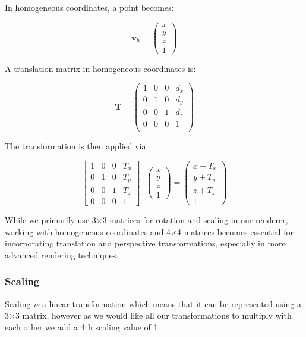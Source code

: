\documentclass[12pt]{article}
\begin{document}
In homogeneous coordinates, a point becomes:

\[
    \mathbf{v}_h = \begin{pmatrix} x \\ y \\ z \\ 1 \end{pmatrix}
\]

A translation matrix in homogeneous coordinates is:

\[
    \mathbf{T} = \begin{pmatrix}
        1 & 0 & 0 & d_x \\
        0 & 1 & 0 & d_y \\
        0 & 0 & 1 & d_z \\
        0 & 0 & 0 & 1   \\
    \end{pmatrix}
\]

The transformation is then applied via:

\[
    \begin{bmatrix}  1 & 0 & 0 & {T_x} \\ 0 & 1 & 0 & {T_y} \\ 0 & 0 & 1 & {T_z} \\ 0 & 0 & 0 & 1 \end{bmatrix} \cdot \begin{pmatrix} x \\ y \\ z \\ 1 \end{pmatrix} = \begin{pmatrix} x + {T_x} \\ y + {T_y} \\ z + {T_z} \\ 1 \end{pmatrix}
\]



While we primarily use 3$\times$3 matrices for rotation and scaling in our renderer, working with homogeneous coordinates and 4$\times$4 matrices becomes essential for incorporating translation and perspective transformations, especially in more advanced rendering techniques.

\subsubsection{Scaling}

Scaling \textit{is} a linear transformation which means that it can be represented using a 3$\times$3 matrix, however as we would like all our transformations to multiply with each other we add a 4th scaling value of 1.
\end{document}
